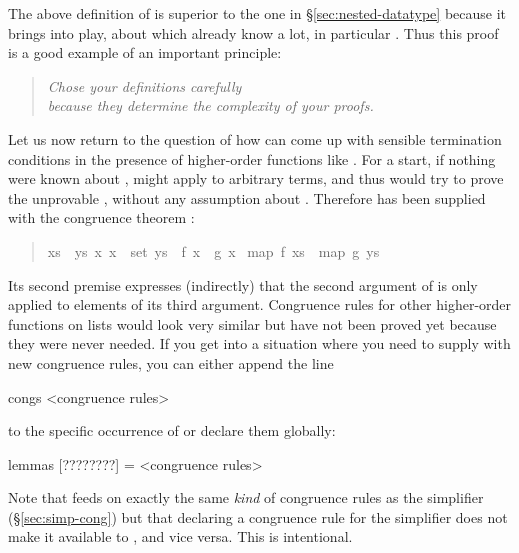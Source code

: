 \begin{isabellebody}
\begin{isamarkuptext}
The above definition of  is superior to the one in \S\ref{sec:nested-datatype}
because it brings  into play, about which already know a lot, in particular
.
Thus this proof is a good example of an important principle:
\begin{quote}
\emph{Chose your definitions carefully\\
because they determine the complexity of your proofs.}
\end{quote}

Let us now return to the question of how  can come up with sensible termination
conditions in the presence of higher-order functions like . For a start, if nothing
were known about ,  might apply  to arbitrary terms,
and thus  would try to prove the unprovable
, without any assumption about .
Therefore  has been supplied with the congruence theorem : 
\begin{quote}

\begin{isabelle}%
{\isasymlbrakk}\mbox{xs}\ {\isacharequal}\ \mbox{ys}{\isacharsemicolon}\ {\isasymAnd}\mbox{x}{\isachardot}\ \mbox{x}\ {\isasymin}\ set\ \mbox{ys}\ {\isasymLongrightarrow}\ \mbox{f}\ \mbox{x}\ {\isacharequal}\ \mbox{g}\ \mbox{x}{\isasymrbrakk}\isanewline
{\isasymLongrightarrow}\ map\ \mbox{f}\ \mbox{xs}\ {\isacharequal}\ map\ \mbox{g}\ \mbox{ys}
\end{isabelle}%

\end{quote}
Its second premise expresses (indirectly) that the second argument of  is only applied
to elements of its third argument. Congruence rules for other higher-order functions on lists would
look very similar but have not been proved yet because they were never needed.
If you get into a situation where you need to supply  with new congruence
rules, you can either append the line
\begin{ttbox}
congs <congruence rules>
\end{ttbox}
to the specific occurrence of  or declare them globally:
\begin{ttbox}
lemmas [????????] = <congruence rules>
\end{ttbox}

Note that  feeds on exactly the same \emph{kind} of
congruence rules as the simplifier (\S\ref{sec:simp-cong}) but that
declaring a congruence rule for the simplifier does not make it
available to , and vice versa. This is intentional.%
\end{isamarkuptext}%
\end{isabellebody}%
